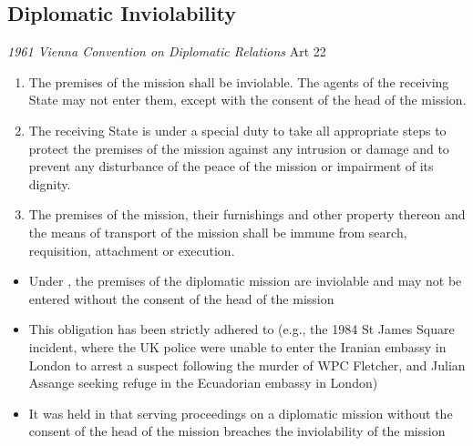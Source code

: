 \subsection{Diplomatic Inviolability}
\begin{conventiondetails}{\textit{1961 Vienna Convention on Diplomatic Relations} Art 22}
    \flushleft
    \begin{enumerate}
        \item The premises of the mission shall be inviolable. The agents of the receiving State may not enter them, except with the consent of the head of the mission.
        \item The receiving State is under a special duty to take all appropriate steps to protect the premises of the mission against any intrusion or damage and to prevent any disturbance of the peace of the mission or impairment of its dignity.
        \item The premises of the mission, their furnishings and other property thereon and the means of transport of the mission shall be immune from search, requisition, attachment or execution.
    \end{enumerate}
\end{conventiondetails}

\begin{itemize}
    \item Under , the premises of the diplomatic mission are inviolable and may not be entered without the consent of the head of the mission
    \item This obligation has been strictly adhered to (e.g., the 1984 St James Square incident, where the UK police were unable to enter the Iranian embassy in London to arrest a suspect following the murder of WPC Fletcher, and Julian Assange seeking refuge in the Ecuadorian embassy in London)
    \item It was held in  that serving proceedings on a diplomatic mission without the consent of the head of the mission breaches the inviolability of the mission
\end{itemize}

